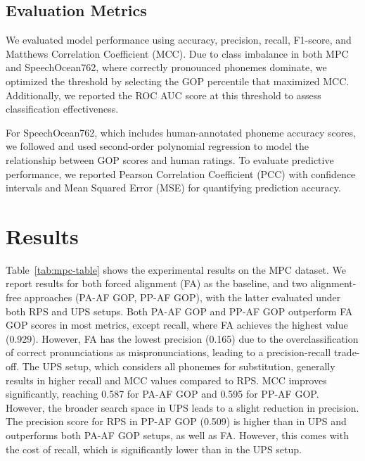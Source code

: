 \documentclass{Interspeech}
\begin{document}
\subsection{Evaluation Metrics}

We evaluated model performance using accuracy, precision, recall, F1-score, and Matthews Correlation Coefficient (MCC). Due to class imbalance in both MPC and SpeechOcean762, where correctly pronounced phonemes dominate, we optimized the threshold by selecting the GOP percentile that maximized MCC. Additionally, we reported the ROC AUC score at this threshold to assess classification effectiveness.

For SpeechOcean762, which includes human-annotated phoneme accuracy scores, we followed \cite{zhang2021speechocean762} and used second-order polynomial regression to model the relationship between GOP scores and human ratings. To evaluate predictive performance, we reported Pearson Correlation Coefficient (PCC) with confidence intervals and Mean Squared Error (MSE) for quantifying prediction accuracy.






\section{Results}

Table~\ref{tab:mpc-table} shows the experimental results on the MPC dataset. We report results for both forced alignment (FA) as the baseline, and two alignment-free approaches (PA-AF GOP, PP-AF GOP), with the latter evaluated under both RPS and UPS setups. Both PA-AF GOP and PP-AF GOP outperform FA GOP scores in most metrics, except recall, where FA achieves the highest value (0.929). However, FA has the lowest precision (0.165) due to the overclassification of correct pronunciations as mispronunciations, leading to a precision-recall trade-off.
%
The UPS setup, which considers all phonemes for substitution, generally results in higher recall and MCC values compared to RPS. MCC improves significantly, reaching 0.587 for PA-AF GOP and 0.595 for PP-AF GOP. However, the broader search space in UPS leads to a slight reduction in precision. The precision score for RPS in PP-AF GOP (0.509) is higher than in UPS and outperforms both PA-AF GOP setups, as well as FA. However, this comes with the cost of recall, which is significantly lower than in the UPS setup.

\end{document}
